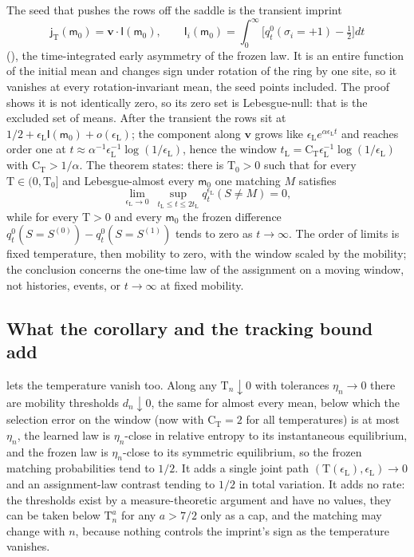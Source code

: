 The seed that pushes the rows off the saddle is the transient imprint
\[
\mathsf j_{\mathrm T}(\mathsf m_0)=\mathbf v\cdot\mathsf I(\mathsf m_0),
\qquad
\mathsf I_i(\mathsf m_0)=\int_0^\infty\bigl[q_t^0(\sigma_i=+1)-\tfrac12\bigr]dt
\]
(), the time-integrated early asymmetry of the frozen law. It is an entire
function of the initial mean and changes sign under rotation of the ring by one site, so it vanishes at
every rotation-invariant mean, the seed points included. The proof shows it is not identically zero, so
its zero set is Lebesgue-null: that is the excluded set of means. After the transient the rows sit at
$1/2+\epsilon_{\mathrm L}\mathsf I(\mathsf m_0)+o(\epsilon_{\mathrm L})$; the component along
$\mathbf v$ grows like $\epsilon_{\mathrm L}e^{\alpha\epsilon_{\mathrm L}t}$ and reaches order one at
$t\approx\alpha^{-1}\epsilon_{\mathrm L}^{-1}\log(1/\epsilon_{\mathrm L})$, hence the window
$t_{\mathrm L}=\mathrm C_{\mathrm T}\epsilon_{\mathrm L}^{-1}\log(1/\epsilon_{\mathrm L})$ with
$\mathrm C_{\mathrm T}>1/\alpha$. The theorem states: there is $\mathrm T_0>0$ such that for every
$\mathrm T\in(0,\mathrm T_0]$ and Lebesgue-almost every $\mathsf m_0$ one matching $M$ satisfies
\[
\lim_{\epsilon_{\mathrm L}\to0}\ \sup_{t_{\mathrm L}\le t\le2t_{\mathrm L}}
q^{\epsilon_{\mathrm L}}_t(S\ne M)=0,
\]
while for every $\mathrm T>0$ and every $\mathsf m_0$ the frozen difference
$q^0_t(S=S^{(0)})-q^0_t(S=S^{(1)})$ tends to zero as $t\to\infty$. The order of limits is fixed
temperature, then mobility to zero, with the window scaled by the mobility; the conclusion concerns the
one-time law of the assignment on a moving window, not histories, events, or $t\to\infty$ at fixed
mobility.

\subsection{What the corollary and the tracking bound add}

 lets the temperature vanish too. Along any $\mathrm T_n\downarrow0$ with
tolerances $\eta_n\to0$ there are mobility thresholds $d_n\downarrow0$, the same for almost every mean,
below which the selection error on the window (now with $\mathrm C_{\mathrm T}=2$ for all temperatures)
is at most $\eta_n$, the learned law is $\eta_n$-close in relative entropy to its instantaneous
equilibrium, and the frozen law is $\eta_n$-close to its symmetric equilibrium, so the frozen matching
probabilities tend to $1/2$. It adds a single joint path $(\mathrm T(\epsilon_{\mathrm L}),
\epsilon_{\mathrm L})\to0$ and an assignment-law contrast tending to $1/2$ in total variation. It adds no
rate: the thresholds exist by a measure-theoretic argument and have no values, they can be taken below
$\mathrm T_n^a$ for any $a>7/2$ only as a cap, and the matching may change with $n$, because nothing
controls the imprint's sign as the temperature vanishes.

